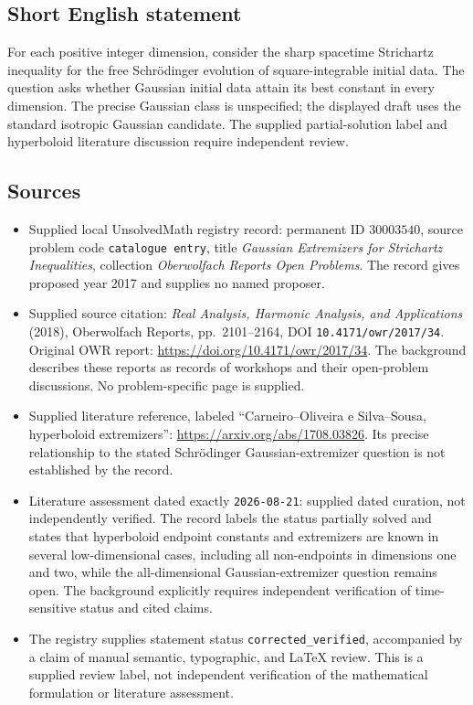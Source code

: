 \documentclass[11pt]{article}
\begin{document}
\subsection{Short English statement}
For each positive integer dimension, consider the sharp spacetime Strichartz inequality for the free Schrödinger evolution of square-integrable initial data. The question asks whether Gaussian initial data attain its best constant in every dimension. The precise Gaussian class is unspecified; the displayed draft uses the standard isotropic Gaussian candidate. The supplied partial-solution label and hyperboloid literature discussion require independent review.
\subsection{Sources}
\begin{itemize}
\item Supplied local UnsolvedMath registry record: permanent ID \(30003540\), source problem code \texttt{catalogue entry}, title \emph{Gaussian Extremizers for Strichartz Inequalities}, collection \emph{Oberwolfach Reports Open Problems}. The record gives proposed year 2017 and supplies no named proposer.
\item Supplied source citation: \emph{Real Analysis, Harmonic Analysis, and Applications} (2018), Oberwolfach Reports, pp.\ 2101--2164, DOI \texttt{10.4171/owr/2017/34}. Original OWR report: \url{https://doi.org/10.4171/owr/2017/34}. The background describes these reports as records of workshops and their open-problem discussions. No problem-specific page is supplied.
\item Supplied literature reference, labeled ``Carneiro--Oliveira e Silva--Sousa, hyperboloid extremizers'': \url{https://arxiv.org/abs/1708.03826}. Its precise relationship to the stated Schrödinger Gaussian-extremizer question is not established by the record.
\item Literature assessment dated exactly \texttt{2026-08-21}: supplied dated curation, not independently verified. The record labels the status partially solved and states that hyperboloid endpoint constants and extremizers are known in several low-dimensional cases, including all non-endpoints in dimensions one and two, while the all-dimensional Gaussian-extremizer question remains open. The background explicitly requires independent verification of time-sensitive status and cited claims.
\item The registry supplies statement status \texttt{corrected\_verified}, accompanied by a claim of manual semantic, typographic, and LaTeX review. This is a supplied review label, not independent verification of the mathematical formulation or literature assessment.
\end{itemize}
\end{document}
